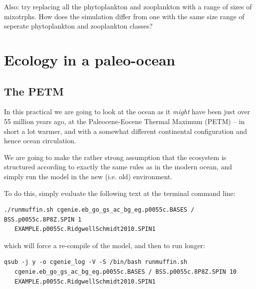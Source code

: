 \documentclass[11pt,fleqn]{book} %
\begin{document}
Also: try replacing all the phytoplankton and zooplankton with a range of sizes of mixotrphs. How does the simulation differ from one with the same size range of seperate phytoplankton and zooplankton classes?


\newpage


\section{Ecology in a paleo-ocean}


\subsection{The PETM} In this practical we are going to look at the ocean as it \textit{might} have been just over 55 million years ago, at the Paleocene-Eocene Thermal Maximum (PETM) -- in short a lot warmer, and with a somewhat different continental configuration and hence ocean circulation.

We are going to make the rather strong assumption that the ecosystem is structured according to exactly the same rules as in the modern ocean, and simply run the model in the new (i.e. old) environment.

To do this, simply evaluate the following text at the terminal command line:

\vspace{-2mm}
\small\begin{verbatim}
./runmuffin.sh cgenie.eb_go_gs_ac_bg_eg.p0055c.BASES / BSS.p0055c.8P8Z.SPIN 1
   EXAMPLE.p0055c.RidgwellSchmidt2010.SPIN1
\end{verbatim}\normalsize
\vspace{-2mm}

\noindent which will force a re-compile of the model, and then to run longer:

\vspace{-2mm}
\small\begin{verbatim}
qsub -j y -o cgenie_log -V -S /bin/bash runmuffin.sh 
   cgenie.eb_go_gs_ac_bg_eg.p0055c.BASES / BSS.p0055c.8P8Z.SPIN 10
   EXAMPLE.p0055c.RidgwellSchmidt2010.SPIN1
\end{verbatim}\normalsize
\vspace{-2mm}
\end{document}
